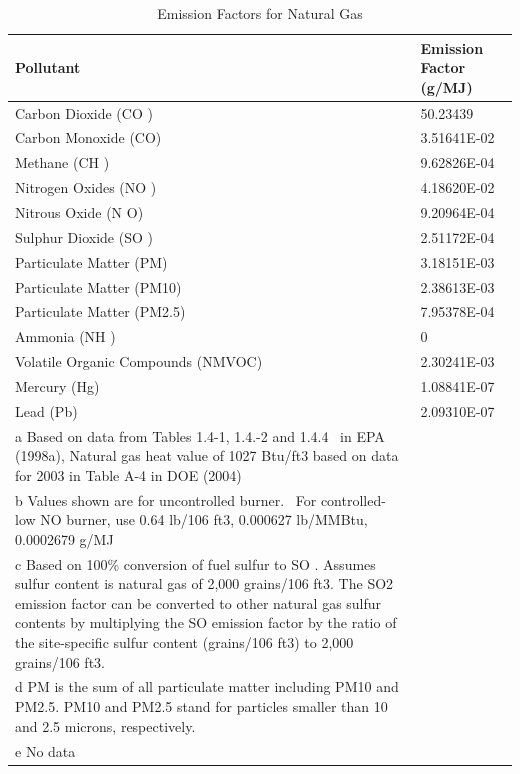 \begin{longtable}[c]{p{4.5in}p{1.5in}}
\caption{  Emission Factors for Natural Gas \protect \label{table:emission-factors-for-natural-gas}}\\
\toprule 
Pollutant & Emission Factor  ~~ (g/MJ) \tabularnewline \midrule
\endhead
Carbon Dioxide (CO  ) & 50.23439 \tabularnewline
Carbon Monoxide (CO) & 3.51641E-02 \tabularnewline
Methane (CH  ) & 9.62826E-04 \tabularnewline
Nitrogen Oxides (NO  ) & 4.18620E-02 \tabularnewline
Nitrous Oxide (N  O) & 9.20964E-04 \tabularnewline
Sulphur Dioxide (SO  ) & 2.51172E-04 \tabularnewline
Particulate Matter (PM) & 3.18151E-03 \tabularnewline
Particulate Matter (PM10) & 2.38613E-03 \tabularnewline
Particulate Matter (PM2.5) & 7.95378E-04 \tabularnewline
Ammonia (NH  ) & 0 \tabularnewline
Volatile Organic Compounds (NMVOC) & 2.30241E-03 \tabularnewline
Mercury (Hg) & 1.08841E-07 \tabularnewline
Lead (Pb) & 2.09310E-07 \tabularnewline
a Based on data from Tables 1.4-1, 1.4.-2 and 1.4.4~ in EPA (1998a), Natural gas heat value of 1027 Btu/ft3 based on data for 2003 in Table A-4 in DOE (2004) \tabularnewline
b Values shown are for uncontrolled burner.~ For controlled-low NO   burner, use 0.64 lb/106 ft3, 0.000627 lb/MMBtu, 0.0002679 g/MJ \tabularnewline
c Based on 100\% conversion of fuel sulfur to SO  . Assumes sulfur content is natural gas of 2,000 grains/106 ft3. The SO2 emission factor can be converted to other natural gas sulfur contents by multiplying the SO   emission factor by the ratio of the site-specific sulfur content (grains/106 ft3) to 2,000 grains/106 ft3. \tabularnewline
d PM is the sum of all particulate matter including PM10 and PM2.5. PM10 and PM2.5 stand for particles smaller than 10 and 2.5 microns, respectively. \tabularnewline
e No data \tabularnewline
\bottomrule
\end{longtable}

